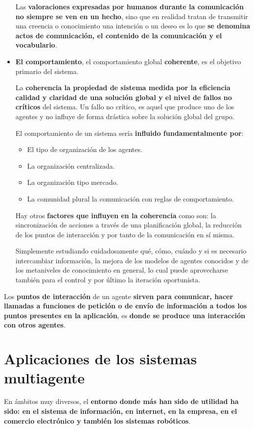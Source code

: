 \documentclass[12pt, twoside, openright]{report} %
\begin{document}
\begin{itemize}
	Las \textbf{valoraciones expresadas por humanos durante la comunicación no siempre se ven en un hecho}, sino que en realidad tratan de transmitir una creencia o conocimiento una intención o un deseo es lo que \textbf{se denomina actos de comunicación, el contenido de la comunicación y el vocabulario}.
	\item \textbf{El comportamiento}, el comportamiento global \textbf{coherente}, es el objetivo primario del sistema.
	
	La \textbf{coherencia la propiedad de sistema medida por la eficiencia calidad y claridad de una solución global y el nivel de fallos no críticos} del sistema. Un fallo no crítico, es aquel que produce uno de los agentes y no influye de forma drástica sobre la solución global del grupo.
	
	El comportamiento de un sistema sería \textbf{influido fundamentalmente por}:
	\begin{itemize}
		\item El tipo de organización de los agentes.
		\item La organización centralizada.
		\item La organización tipo mercado.
		\item La comunidad plural la comunicación con reglas de comportamiento.
	\end{itemize}
	
	Hay otros \textbf{factores que influyen en la coherencia} como son: la sincronización de acciones a través de una planificación global, la reducción de los puntos de interacción y por tanto de la comunicación en sí misma.
	
	Simplemente estudiando cuidadosamente qué, cómo, cuándo y si es necesario intercambiar información, la mejora de los modelos de agentes conocidos y de los metaniveles de conocimiento en general, lo cual puede aprovecharse también para el control y por último la iteración oportunista.
\end{itemize}

Los \textbf{puntos de interacción} de un agente \textbf{sirven para comunicar, hacer llamadas a funciones de petición o de envío de información a todos los puntos presentes en la aplicación}, es \textbf{donde se produce una interacción con otros agentes}.
\pagebreak

\section{Aplicaciones de los sistemas multiagente} 
En ámbitos muy diversos, el \textbf{entorno donde más han sido de utilidad ha sido: en el sistema de información, en internet, en la empresa, en el comercio electrónico y también los sistemas robóticos}.
\end{document}
